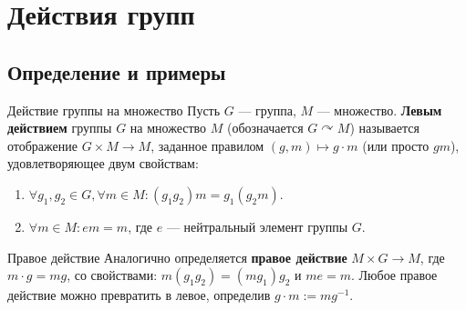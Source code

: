
\section{Действия групп}

\subsection{Определение и примеры}

\begin{Definition}{Действие группы на множество}{}
	Пусть $G$ — группа, $M$ — множество. \textbf{Левым действием} группы $G$ на множество $M$ (обозначается $G \curvearrowright M$) называется отображение $G \times M \to M$, заданное правилом $(g, m) \mapsto g \cdot m$ (или просто $gm$), удовлетворяющее двум свойствам:
	\begin{enumerate}
		\item $\forall g_1, g_2 \in G, \forall m \in M \colon (g_1 g_2)m = g_1(g_2 m)$.
		\item $\forall m \in M \colon em = m$, где $e$ — нейтральный элемент группы $G$.
	\end{enumerate}
\end{Definition}

\begin{Remark}{Правое действие}{}
	Аналогично определяется \textbf{правое действие} $M \times G \to M$, где $m \cdot g = mg$, со свойствами: $m(g_1 g_2) = (mg_1)g_2$ и $me = m$. Любое правое действие можно превратить в левое, определив $g \cdot m := m g^{-1}$.
\end{Remark}

